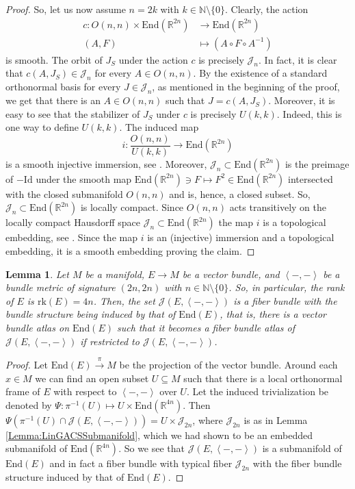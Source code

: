 \documentclass[12pt,a4paper]{article}
\theoremstyle{plain}
\newtheorem{lemma}[theorem]{Lemma}
\theoremstyle{definition}
\newcommand{\R}{\mathbb{R}}
\newcommand{\N}{\mathbb{N}}
\newcommand{\scal}[2]{\left\langle #1,#2\right\rangle}
\newcommand{\Jcal}{\mathcal{J}}
\begin{document}
\begin{proof}
So, let us now assume $n=2k$ with $k\in \N\setminus \{0\}$.
Clearly, the action
\begin{align*}
    c:O(n,n)\times \mathrm{End}(\R^{2n})&\longrightarrow \mathrm{End}(\R^{2n})\\
    (A,F)&\longmapsto (A\circ F\circ A^{-1})
\end{align*}
is smooth. The orbit of $J_S$ under the action $c$ is precisely $\Jcal_{n}$. In fact, it is clear that $c(A,J_S)\in \Jcal_n$ for every $A\in O(n,n)$. By the existence of a standard orthonormal basis for every $J\in \Jcal_n$, as mentioned in the beginning of the proof, we get that there is an $A\in O(n,n)$ such that $J=c(A,J_S)$. Moreover, it is easy to see that the stabilizer of $J_S$ under $c$ is precisely $U(k,k)$. Indeed, this is one way to define $U(k,k)$. The induced map 
\begin{equation*}
    i:\frac{O(n,n)}{U(k,k)}\longrightarrow \mathrm{End}(\R^{2n})
\end{equation*}
is a smooth injective immersion, see \cite[Corollary 3.8.10]{gauge}. Moreover, $\Jcal_n\subset \mathrm{End}(\R^{2n})$ is the preimage of $-\mathrm{Id}$ under the smooth map $\mathrm{End}(\R^{2n})\ni F\mapsto F^2\in \mathrm{End}(\R^{2n})$ intersected with the closed submanifold $O(n,n)$ and is, hence, a closed subset. So, $\Jcal_n\subset \mathrm{End}(\R^{2n})$ is locally compact.
Since $O(n,n)$ acts transitively on the locally compact Hausdorff space $\Jcal_n\subset \mathrm{End}(\R^{2n})$ the map $i$ is a topological embedding, see \cite[Chapter II, Section 2.13, p.~65]{montgomery2018topological}. Since the map $i$ is an (injective) immersion and a topological embedding, it is a smooth embedding proving the claim. 
\end{proof}


\begin{lemma}
\label{Lemma:GACS-Subbundle}
Let $M$ be a manifold, $E\to M$ be a vector bundle, and $\scal{-}{-}$ be a bundle metric of signature $(2n,2n)$ with $n\in \N\setminus \{0\}$. So, in particular, the rank of $E$ is $\mathrm{rk}(E)=4n$. Then, the set $\Jcal(E,\scal{-}{-})$ is a fiber bundle with the bundle structure being induced by that of $\mathrm{End}(E)$, that is, there is a vector bundle atlas on $\mathrm{End}(E)$ such that it becomes a fiber bundle atlas of $\Jcal(E,\scal{-}{-})$ if restricted to $\Jcal(E,\scal{-}{-})$.  
\end{lemma}
\begin{proof}
Let $\mathrm{End}(E)\xrightarrow{\pi}M$ be the projection of the vector bundle. Around each $x\in M$ we can find an open subset $U\subseteq M$ such that there is a local orthonormal frame of $E$ with respect to $\scal{-}{-}$ over $U$. Let the induced trivialization be denoted by
$\Psi:\pi^{-1}(U)\mapsto U\times \mathrm{End}(\R^{4n})$. Then $\Psi(\pi^{-1}(U)\cap \Jcal(E,\scal{-}{-}))=U\times \Jcal_{2n}$, where $\Jcal_{2n}$ is as in Lemma \ref{Lemma:LinGACSSubmanifold}, which we had shown to be an embedded submanifold of $\mathrm{End}(\R^{4n})$. So we see that $\Jcal(E,\scal{-}{-})$ is a submanifold of $\mathrm{End}(E)$ and in fact a fiber bundle with typical fiber $\Jcal_{2n}$ with the fiber bundle structure induced by that of $\mathrm{End}(E)$. 
\end{proof}
\end{document}
